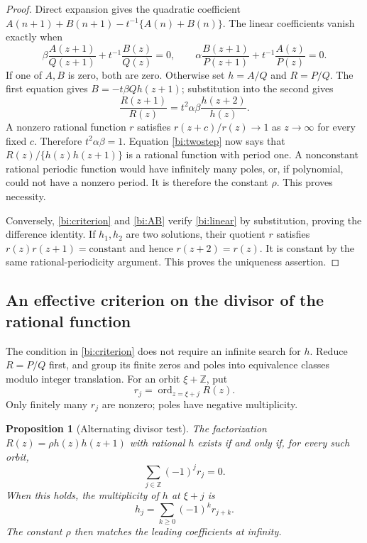 \documentclass[11pt,letterpaper]{article}
\numberwithin{equation}{section}
\newtheorem{proposition}[theorem]{Proposition}
\theoremstyle{definition}
\theoremstyle{remark}
\DeclareMathOperator{\ord}{ord}
\newcommand{\Z}{\mathbb Z}
\begin{document}
\begin{proof}
Direct expansion gives the quadratic coefficient
$A(n+1)+B(n+1)-t^{-1}\{A(n)+B(n)\}$. The linear coefficients vanish
exactly when
\begin{equation}\label{bi:linear}
 \beta\frac{A(z+1)}{Q(z+1)}+t^{-1}\frac{B(z)}{Q(z)}=0,
 \qquad
 \alpha\frac{B(z+1)}{P(z+1)}+t^{-1}\frac{A(z)}{P(z)}=0.
\end{equation}
If one of $A,B$ is zero, both are zero. Otherwise set
$h=A/Q$ and $R=P/Q$. The first equation gives
$B=-t\beta Qh(z+1)$; substitution into the second gives
\begin{equation}\label{bi:twostep}
 \frac{R(z+1)}{R(z)}
       =t^2\alpha\beta\frac{h(z+2)}{h(z)}.
\end{equation}
A nonzero rational function $r$ satisfies $r(z+c)/r(z)\to1$ as
$z\to\infty$ for every fixed $c$. Therefore
$t^2\alpha\beta=1$. Equation \eqref{bi:twostep} now says that
$R(z)/\{h(z)h(z+1)\}$ is a rational function with period one.
A nonconstant rational periodic function would have infinitely many
poles, or, if polynomial, could not have a nonzero period. It is
therefore the constant $\rho$. This proves necessity.

Conversely, \eqref{bi:criterion} and \eqref{bi:AB} verify
\eqref{bi:linear} by substitution, proving the difference identity.
If $h_1,h_2$ are two solutions, their quotient $r$ satisfies
$r(z)r(z+1)=\text{constant}$ and hence $r(z+2)=r(z)$.
It is constant by the same rational-periodicity argument. This proves
the uniqueness assertion.
\end{proof}

\subsection{An effective criterion on the divisor of the rational function}

The condition in \eqref{bi:criterion} does not require an infinite
search for $h$. Reduce $R=P/Q$ first, and group its finite zeros and
poles into equivalence classes modulo integer translation. For an orbit
$\xi+\Z$, put
\[
 r_j=\ord_{z=\xi+j}R(z).
\]
Only finitely many $r_j$ are nonzero; poles have negative multiplicity.

\begin{proposition}[Alternating divisor test]
\label{bi:divisor}
The factorization $R(z)=\rho h(z)h(z+1)$ with rational $h$ exists
if and only if, for every such orbit,
\begin{equation}\label{bi:divisorcondition}
 \sum_{j\in\Z}(-1)^j r_j=0.
\end{equation}
When this holds, the multiplicity of $h$ at $\xi+j$ is
\begin{equation}\label{bi:divisorconstruction}
 h_j=\sum_{k\ge0}(-1)^k r_{j+k}.
\end{equation}
The constant $\rho$ then matches the leading coefficients at infinity.
\end{proposition}
\end{document}
